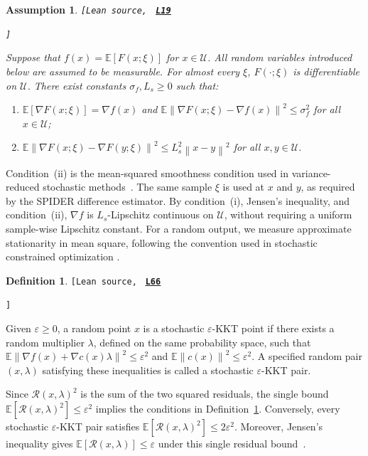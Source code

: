 \documentclass[11pt]{article}
\newtheorem{assumption}[theorem]{Assumption}
\theoremstyle{definition}
\newtheorem{definition}[theorem]{Definition}
\theoremstyle{remark}
\numberwithin{equation}{section}
\numberwithin{figure}{section}
\numberwithin{table}{section}
\numberwithin{algorithm}{section}
\newcommand{\E}{\mathbb{E}}
\newcommand{\eps}{\varepsilon}
\newcommand{\norm}[1]{\left\lVert #1\right\rVert}
\newcommand{\grad}{\nabla}
\newcommand{\leanLinkText}[1]{%
  \underline{\textbf{#1}}%
}
\newcommand{\leanDeclTag}[2]{%
  {\footnotesize\texttt{[Lean source, }}%
  \href{https://github.com/optpku/ReasBook/blob/v4.32.2/ReasBook/Papers/TR_LALM_theory/#1?plain=1\#L#2}%
    {\leanLinkText{\footnotesize\texttt{L#2}}}%
}
\newcommand{\leanDeclTagEnd}{%
  \unskip
  {\footnotesize\texttt{]}}\enspace
}
\begin{document}
\begin{assumption}
\label{ass:stoch}
\leanDeclTag{Assumption_3_1/Oracle.lean}{19}
\leanDeclTagEnd
Suppose that \(f(x)=\E[F(x;\xi)]\) for \(x\in\mathcal U\).  All random
variables introduced below are assumed to be measurable.
For almost every \(\xi\), \(F(\cdot;\xi)\) is differentiable on \(\mathcal U\).
There exist constants \(\sigma_f,L_s\ge0\) such that:
\begin{enumerate}[label=\textup{(\roman*)},leftmargin=2.5em,itemsep=0.15em,topsep=0.25em]
\item \(\E[\grad F(x;\xi)]=\grad f(x)\) and
      \(\E\norm{\grad F(x;\xi)-\grad f(x)}^2\le\sigma_f^2\) for all
      \(x\in\mathcal U\);
\item \(\E\norm{\grad F(x;\xi)-\grad F(y;\xi)}^2
      \le L_s^2\norm{x-y}^2\) for all \(x,y\in\mathcal U\).
\end{enumerate}
\end{assumption}

Condition~\textup{(ii)} is the mean-squared smoothness condition used in variance-reduced stochastic methods~\cite{ShiWangWang2025}. The same sample \(\xi\) is used at \(x\) and \(y\), as required by the SPIDER difference estimator.  By condition~\textup{(i)}, Jensen's inequality, and condition~\textup{(ii)}, \(\grad f\) is \(L_s\)-Lipschitz continuous on \(\mathcal U\), without requiring a uniform sample-wise Lipschitz constant. For a random output, we measure approximate stationarity in mean square, following the convention used in stochastic constrained optimization \cite{ShiWangWang2025,LiEtAl2024Stoc}.

\begin{definition}
\label{def:stoch-eps-kkt}
\leanDeclTag{Definition_3_2/Stochastic.lean}{66}
\leanDeclTagEnd
Given \(\eps\ge0\), a random point \(x\) is a stochastic \(\eps\)-KKT point if there exists a random multiplier \(\lambda\), defined on the same probability space, such that \(\E\norm{\grad f(x)+\grad c(x)\lambda}^2\le\eps^2\) and \(\E\norm{c(x)}^2\le\eps^2\).  A specified random pair \((x,\lambda)\) satisfying these inequalities is called a stochastic \(\eps\)-KKT pair.
\end{definition}

Since \(\mathcal R(x,\lambda)^2\) is the sum of the two squared residuals, the single bound \(\E[\mathcal R(x,\lambda)^2]\le\eps^2\) implies the conditions in Definition~\ref{def:stoch-eps-kkt}.  Conversely, every stochastic \(\eps\)-KKT pair satisfies \(\E[\mathcal R(x,\lambda)^2]\le2\eps^2\).  Moreover, Jensen's inequality
gives \(\E[\mathcal R(x,\lambda)]\le\eps\) under this single residual bound~\cite{AlacaogluWright2024,CuiEtAl2026}.
\end{document}
